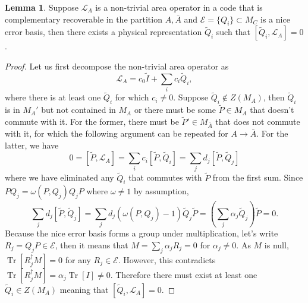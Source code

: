 \documentclass[a4paper,11pt]{article}
\theoremstyle{definition}
\newtheorem{lemma}{Lemma}[section]
\numberwithin{equation}{section}
\DeclareMathOperator{\Tr}{Tr}
\begin{document}
\begin{lemma}\label{lemma:2}
 Suppose $\mathcal{L}_A$ is a non-trivial area operator in a code that is complementary recoverable in the partition $A,\bar{A}$ and $\mathcal{E}=\{Q_i\}\subset M_C$ is a nice error basis, then there exists a physical representation $\tilde{Q}_i$ such that $[\tilde{Q}_i,\mathcal{L}_A]=0$.
\end{lemma}
\begin{proof}
    Let us first decompose the non-trivial area operator as
 \begin{equation}
     \mathcal{L}_A = c_0 \tilde{I}+\sum_i c_i \tilde{Q}_i,
 \end{equation}
 where there is at least one $\tilde{Q}_i$ for which $c_i\ne 0$. Suppose $\tilde{Q}_i\not\in Z(M_A)$, then $\tilde{Q}_i$ is in $M_A'$ but not contained in $M_A$ or there must be some $\tilde{P}\in M_A$ that doesn't commute with it. For the former, there must be $\tilde{P}'\in M_{\bar{A}}$ that does not commute with it, for which the following argument can be repeated for $A\rightarrow \bar{A}$. For the latter, we have
 $$0=[\tilde{P},\mathcal{L}_A] = \sum_i c_i [\tilde P,\tilde Q_i]= \sum_j d_j [\tilde P,\tilde Q_j]$$
where we have eliminated any $\tilde Q_i$ that commutes with $\tilde P$ from the first sum. Since $PQ_j=\omega(P,Q_j) Q_jP$ where $\omega\ne 1$ by assumption, 
$$\sum_j d_j [\tilde P,\tilde Q_j] = \sum_j d_j (\omega(P,Q_j)-1)\tilde Q_j \tilde P = (\sum_j\alpha_j \tilde Q_j) \tilde P=0.$$
Because the nice error basis forms a group under multiplication, let's write ${R}_j= Q_j  P\in\mathcal{E}$, then it means that $ M=\sum_j\alpha_j  R_j=0$ for $\alpha_j \ne 0$. As $ M$ is null, $\Tr[R^{\dagger}_j M]=0$ for any $R_j\in \mathcal{E}$. However, this contradicts $\Tr[ R_j^{\dagger} M]=\alpha_j\Tr[I]\ne 0$. Therefore there must exist at least one $\tilde{Q}_i\in Z(M_A)$ meaning that $[\tilde{Q}_i,\mathcal{L}_A]=0$. 
\end{proof}





 
\end{document}
